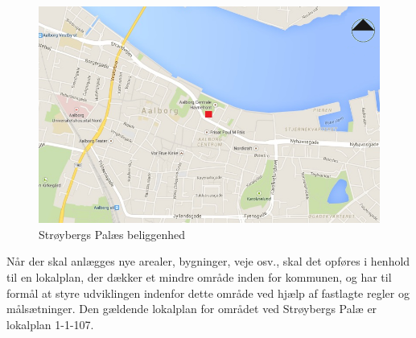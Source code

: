 \begin{figure}[htbp]
	\centering
	\includegraphics[width=1.0\textwidth]{billeder/aalborg.png}
	\caption{Strøybergs Palæs beliggenhed}
	\label{fig:aalborg}
\end{figure}

\indent{     }  Når der skal anlægges nye arealer, bygninger, veje osv., skal det opføres i henhold til en lokalplan, der dækker et mindre område inden for kommunen, og har til formål at styre udviklingen indenfor dette område ved hjælp af fastlagte regler og målsætninger. Den gældende lokalplan for området ved Strøybergs Palæ er lokalplan 1-1-107. 